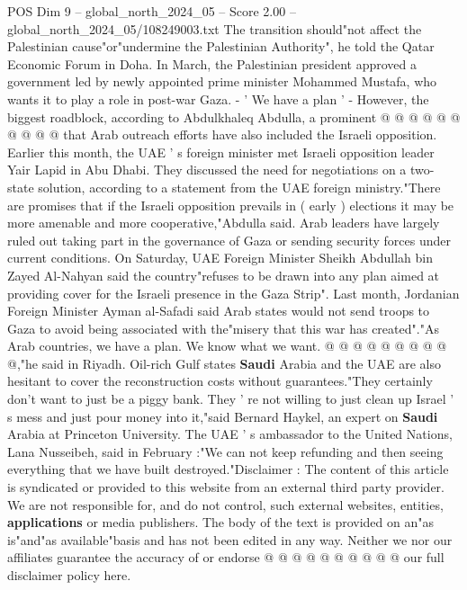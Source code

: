 \begin{textsample}{POS Dim 9 – global\_north\_2024\_05 – Score 2.00 – global\_north\_2024\_05/108249003.txt}
The transition should"not affect the Palestinian cause"or"undermine the Palestinian Authority", he told the Qatar Economic Forum in Doha.
In March, the Palestinian president approved a government led by newly appointed prime minister Mohammed Mustafa, who wants it to play a role in post-war Gaza. - ' We have a plan ' - However, the biggest roadblock, according to Abdulkhaleq Abdulla, a prominent @ @ @ @ @ @ @ @ @ @ that Arab outreach efforts have also included the Israeli opposition.
Earlier this month, the UAE ' s foreign minister met Israeli opposition leader Yair Lapid in Abu Dhabi.
They discussed the need for negotiations on a two-state solution, according to a statement from the UAE foreign ministry."There are promises that if the Israeli opposition prevails in ( early ) elections it may be more amenable and more cooperative,"Abdulla said.
Arab leaders have largely ruled out taking part in the governance of Gaza or sending security forces under current conditions.
On Saturday, UAE Foreign Minister Sheikh Abdullah bin Zayed Al-Nahyan said the country"refuses to be drawn into any plan aimed at providing cover for the Israeli presence in the Gaza Strip".
Last month, Jordanian Foreign Minister Ayman al-Safadi said Arab states would not send troops to Gaza to avoid being associated with the"misery that this war has created"."As Arab countries, we have a plan.
We know what we want. @ @ @ @ @ @ @ @ @ @,"he said in Riyadh.
Oil-rich Gulf states \textbf{Saudi} Arabia and the UAE are also hesitant to cover the reconstruction costs without guarantees."They certainly don't want to just be a piggy bank.
They ' re not willing to just clean up Israel ' s mess and just pour money into it,"said Bernard Haykel, an expert on \textbf{Saudi} Arabia at Princeton University.
The UAE ' s ambassador to the United Nations, Lana Nusseibeh, said in February :"We can not keep refunding and then seeing everything that we have built destroyed."Disclaimer : The content of this article is syndicated or provided to this website from an external third party provider.
We are not responsible for, and do not control, such external websites, entities, \textbf{applications} or media publishers.
The body of the text is provided on an"as is"and"as available"basis and has not been edited in any way.
Neither we nor our affiliates guarantee the accuracy of or endorse @ @ @ @ @ @ @ @ @ @ our full disclaimer policy here.

\end{textsample}
